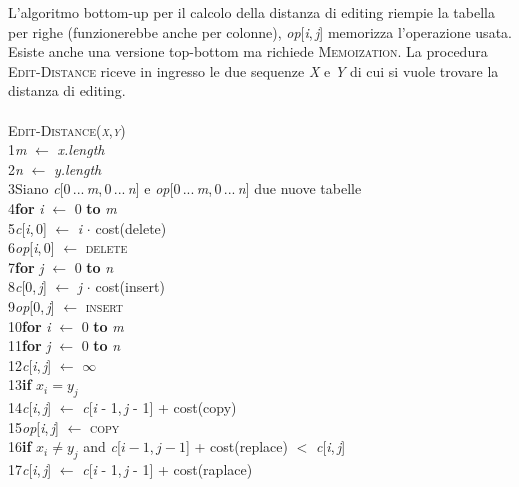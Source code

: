 \documentclass[10pt, a4paper]{report}
\newcommand\firsttab[1][0.5cm]{\hspace*{#1}}
\newcommand\secondtab[1][1cm]{\hspace*{#1}}
\newcommand\thirdtab[1][1.5cm]{\hspace*{#1}}
\newcommand\fourthtab[1][2cm]{\hspace*{#1}}
\begin{document}
L'algoritmo bottom-up per il calcolo della distanza di editing riempie la tabella per righe (funzionerebbe anche per colonne), \textit{op}[\textit{i},\,\textit{j}] memorizza l'operazione usata. Esiste anche una versione top-bottom ma richiede \textsc{Memoization}. La procedura \textsc{Edit-Distance} riceve in ingresso le due sequenze \textit{X} e \textit{Y} di cui si vuole trovare la distanza di editing.\\\\
\textsc{Edit-Distance(\textit{x},\textit{y})}\\
1\firsttab\textit{m} $\leftarrow$ \textit{x.length}\\
2\firsttab\textit{n} $\leftarrow$ \textit{y.length}\\
3\firsttab Siano \textit{c}[0\,...\,\textit{m},\,0\,...\,\textit{n}] e \textit{op}[0\,...\,\textit{m},\,0\,...\,\textit{n}] due nuove tabelle\\
4\firsttab\textbf{for} \textit{i} $\leftarrow$ 0 \textbf{to} \textit{m}\\
5\secondtab\textit{c}[\textit{i},\,0] $\leftarrow$ \textit{i} $\cdot$ cost(delete)\\
6\secondtab\textit{op}[\textit{i},\,0] $\leftarrow$ \textsc{delete}\\
7\firsttab\textbf{for} \textit{j} $\leftarrow$ 0 \textbf{to} \textit{n}\\
8\secondtab\textit{c}[0,\,\textit{j}] $\leftarrow$ \textit{j} $\cdot$ cost(insert)\\
9\secondtab\textit{op}[0,\,\textit{j}] $\leftarrow$ \textsc{insert}\\
10\firsttab\textbf{for} \textit{i} $\leftarrow$ 0 \textbf{to} \textit{m}\\
11\secondtab\textbf{for} \textit{j} $\leftarrow$ 0 \textbf{to} \textit{n}\\
12\thirdtab\textit{c}[\textit{i},\,\textit{j}] $\leftarrow$ $\infty$\\
13\thirdtab\textbf{if} $x_i = y_j$\\
14\fourthtab\textit{c}[\textit{i},\,\textit{j}] $\leftarrow$ \textit{c}[\textit{i} - 1,\,\textit{j} - 1] + cost(copy)\\
15\fourthtab\textit{op}[\textit{i},\,\textit{j}] $\leftarrow$ \textsc{copy}\\
16\thirdtab\textbf{if} $x_i \neq y_j$ and \textit{c}[$i - 1$,\,$j - 1$] + cost(replace) $<$ \textit{c}[\textit{i},\,\textit{j}]\\
17\fourthtab\textit{c}[\textit{i},\,\textit{j}] $\leftarrow$ \textit{c}[\textit{i} - 1,\,\textit{j} - 1] + cost(raplace)\\
\end{document}
